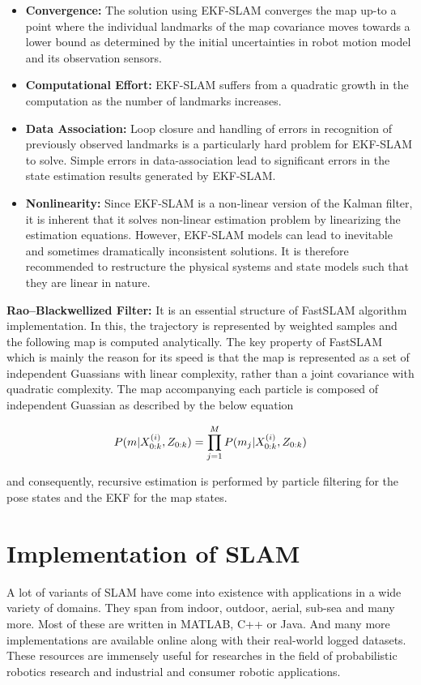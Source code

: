 \documentclass[conference]{IEEEtran}
\begin{document}
\begin{itemize}
	\item \textbf{Convergence:} The solution using EKF-SLAM converges the map up-to a point where the individual landmarks of the map covariance moves towards a lower bound as determined by the initial uncertainties in robot motion model and its observation sensors.
    \item \textbf{Computational Effort:} EKF-SLAM suffers from a quadratic growth in the computation as the number of landmarks increases.
    \item \textbf{Data Association:} Loop closure and handling of errors in recognition of previously observed landmarks is a particularly hard problem for EKF-SLAM to solve. Simple errors in data-association lead to significant errors in the state estimation results generated by EKF-SLAM.
    \item \textbf{Nonlinearity:} Since EKF-SLAM is a non-linear version of the Kalman filter, it is inherent that it solves non-linear estimation problem by linearizing the estimation equations. However, EKF-SLAM models can lead to inevitable and sometimes dramatically inconsistent solutions. It is therefore recommended to restructure the physical systems and state models such that they are linear in nature.
\end{itemize}

\par
\textbf{Rao--Blackwellized Filter:} It is an essential structure of FastSLAM algorithm implementation. In this, the trajectory is represented by weighted samples and the following map is computed analytically. The key property of FastSLAM which is mainly the reason for its speed is that the map is represented as a set of independent Guassians with linear complexity, rather than a joint covariance with quadratic complexity. The map accompanying each particle is composed of independent Guassian as described by the below equation

\begin{equation}
\boldmath P(m|X_{0:k}^{(i)}, Z_{0:k}) = \prod_{j = 1}^{M} P(m_j|X_{0:k}^{(i)}, Z_{0:k})
\end{equation}

and consequently, recursive estimation is performed by particle filtering for the pose states and the EKF for the map states.

\section {Implementation of SLAM}
A lot of variants of SLAM have come into existence with applications in a wide variety of domains. They span from indoor, outdoor, aerial, sub-sea and many more. Most of these are written in MATLAB, C++ or Java. And many more implementations are available online along with their real-world logged datasets. These resources are immensely useful for researches in the field of probabilistic robotics research and industrial and consumer robotic applications.
\end{document}
